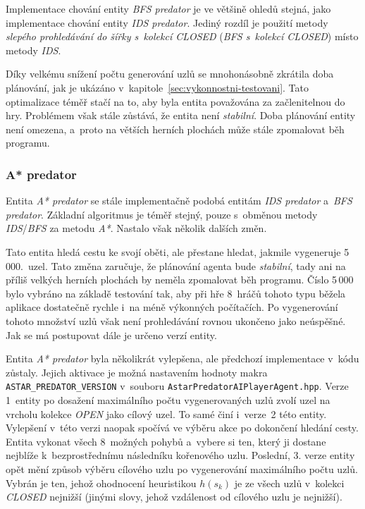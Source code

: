 Implementace chování entity \emph{BFS predator} je ve většině ohledů stejná, jako implementace chování entity \emph{IDS predator}. Jediný rozdíl je použití metody \emph{slepého prohledávání do šířky s~kolekcí CLOSED} (\emph{BFS s~kolekcí CLOSED}) místo metody \emph{IDS}.

Díky velkému snížení počtu generování uzlů se mnohonásobně zkrátila doba plánování, jak je ukázáno v~kapitole~\ref{sec:vykonnostni-testovani}. Tato optimalizace téměř stačí na to, aby byla entita považována za začlenitelnou do hry. Problémem však stále zůstává, že entita není \emph{stabilní}. Doba plánování entity není omezena, a~proto na větších herních plochách může stále zpomalovat běh programu.

\subsubsection*{A* predator}

Entita \emph{A* predator} se stále implementačně podobá entitám \emph{IDS predator} a~\emph{BFS predator}. Základní algoritmus je téměř stejný, pouze s~obměnou metody \emph{IDS}/\emph{BFS} za metodu \emph{A*}. Nastalo však několik dalších změn.

Tato entita hledá cestu ke svojí oběti, ale přestane hledat, jakmile vygeneruje 5\,000.~uzel. Tato změna zaručuje, že plánování agenta bude \emph{stabilní}, tady ani na příliš velkých herních plochách by neměla zpomalovat běh programu. Číslo 5\,000 bylo vybráno na základě testování tak, aby při hře 8~hráčů tohoto typu běžela aplikace dostatečně rychle i~na méně výkonných počítačích. Po vygenerování tohoto množství uzlů však není prohledávání rovnou ukončeno jako neúspěšné. Jak se má postupovat dále je určeno verzí entity.

Entita \emph{A* predator} byla několikrát vylepšena, ale předchozí implementace v~kódu zůstaly. Jejich aktivace je možná nastavením hodnoty makra \texttt{ASTAR\_PREDATOR\_VERSION} v~souboru \texttt{AstarPredatorAIPlayerAgent.hpp}. Verze 1~entity po dosažení maximálního počtu vygenerovaných uzlů zvolí uzel na vrcholu kolekce \emph{OPEN} jako cílový uzel. To samé činí i~verze~2 této entity. Vylepšení v~této verzi naopak spočívá ve výběru akce po dokončení hledání cesty. Entita  vykonat všech 8~možných pohybů a~vybere si ten, který ji dostane nejblíže k~bezprostřednímu následníku kořenového uzlu. Poslední, 3. verze entity opět mění způsob výběru cílového uzlu po vygenerování maximálního počtu uzlů. Vybrán je ten, jehož ohodnocení heuristikou $h(s_k)$ je ze všech uzlů v~kolekci \emph{CLOSED} nejnižší (jinými slovy, jehož vzdálenost od cílového uzlu je nejnižší).

